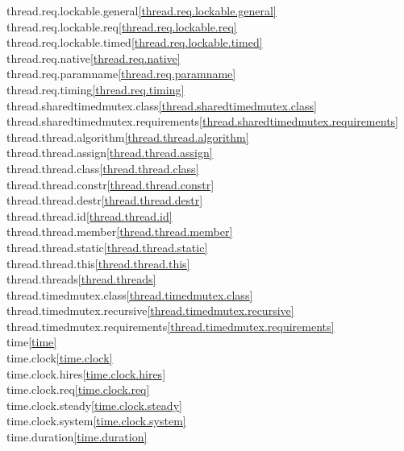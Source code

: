 \begin{multicols}{2}
thread.req.lockable.general\quad\ref{thread.req.lockable.general}\\
thread.req.lockable.req\quad\ref{thread.req.lockable.req}\\
thread.req.lockable.timed\quad\ref{thread.req.lockable.timed}\\
thread.req.native\quad\ref{thread.req.native}\\
thread.req.paramname\quad\ref{thread.req.paramname}\\
thread.req.timing\quad\ref{thread.req.timing}\\
thread.sharedtimedmutex.class\quad\ref{thread.sharedtimedmutex.class}\\
thread.sharedtimedmutex.requirements\quad\ref{thread.sharedtimedmutex.requirements}\\
thread.thread.algorithm\quad\ref{thread.thread.algorithm}\\
thread.thread.assign\quad\ref{thread.thread.assign}\\
thread.thread.class\quad\ref{thread.thread.class}\\
thread.thread.constr\quad\ref{thread.thread.constr}\\
thread.thread.destr\quad\ref{thread.thread.destr}\\
thread.thread.id\quad\ref{thread.thread.id}\\
thread.thread.member\quad\ref{thread.thread.member}\\
thread.thread.static\quad\ref{thread.thread.static}\\
thread.thread.this\quad\ref{thread.thread.this}\\
thread.threads\quad\ref{thread.threads}\\
thread.timedmutex.class\quad\ref{thread.timedmutex.class}\\
thread.timedmutex.recursive\quad\ref{thread.timedmutex.recursive}\\
thread.timedmutex.requirements\quad\ref{thread.timedmutex.requirements}\\
time\quad\ref{time}\\
time.clock\quad\ref{time.clock}\\
time.clock.hires\quad\ref{time.clock.hires}\\
time.clock.req\quad\ref{time.clock.req}\\
time.clock.steady\quad\ref{time.clock.steady}\\
time.clock.system\quad\ref{time.clock.system}\\
time.duration\quad\ref{time.duration}\\

\end{multicols}
